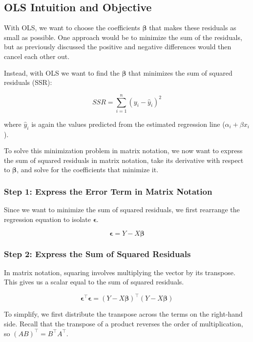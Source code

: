 \documentclass[12pt]{article}
\begin{document}
\subsection{OLS Intuition and Objective}

With OLS, we want to choose the coefficients $\boldsymbol{\beta}$ that makes these residuals as small as possible. One approach would be to minimize the sum of the residuals, but as previously discussed the positive and negative differences would then cancel each other out.

Instead, with OLS we want to find the
$\boldsymbol{\beta}$ that minimizes the sum of squared residuals (SSR):

\[
SSR =
\sum_{i=1}^{n}(y_i-\hat{y}_i)^2
\]

where $\hat{y}_i$ is again the values predicted from the estimated regression line (\(\alpha_i + \beta x_i\)).

To solve this minimization problem in matrix notation, we now want to express the sum of squared residuals in matrix notation, take its
derivative with respect to $\boldsymbol{\beta}$, and
solve for the coefficients that minimize it.


\subsubsection*{Step 1: Express the Error Term in Matrix Notation}

Since we want to minimize the sum of squared residuals,
we first rearrange the regression equation to isolate
$\boldsymbol{\epsilon}$.

\[
\boldsymbol{\epsilon}
= Y-X\boldsymbol{\beta}
\]


\subsubsection*{Step 2: Express the Sum of Squared Residuals}

In matrix notation, squaring involves multiplying the vector by its transpose.
This gives us a scalar equal to the sum of squared residuals.

\[
\boldsymbol{\epsilon}^{\top}\boldsymbol{\epsilon}
=
(Y-X\boldsymbol{\beta})^{\top}
(Y-X\boldsymbol{\beta})
\]

To simplify, we first distribute the transpose across the terms on the right-hand side. Recall that the transpose of a product
reverses the order of multiplication, so
$(AB)^{\top}=B^{\top}A^{\top}$.
\end{document}
